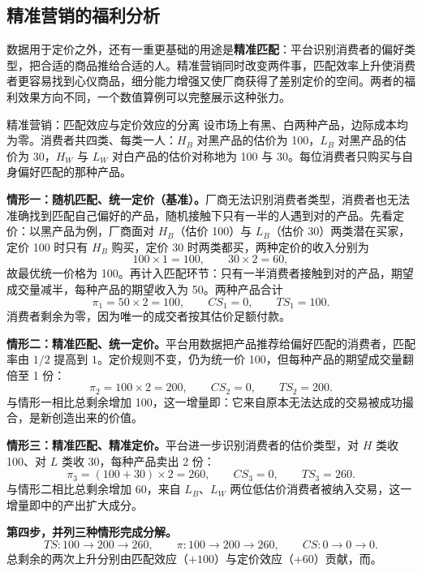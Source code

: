 \subsection{精准营销的福利分析}

数据用于定价之外，还有一重更基础的用途是\textbf{精准匹配}：平台识别消费者的偏好类型，把合适的商品推给合适的人。精准营销同时改变两件事，匹配效率上升使消费者更容易找到心仪商品，细分能力增强又使厂商获得了差别定价的空间。两者的福利效果方向不同，一个数值算例可以完整展示这种张力。

\begin{derivation}{精准营销：匹配效应与定价效应的分离}{}
设市场上有黑、白两种产品，边际成本均为零。消费者共四类、每类一人：$H_B$ 对黑产品的估价为 100，$L_B$ 对黑产品的估价为 30，$H_W$ 与 $L_W$ 对白产品的估价对称地为 100 与 30。每位消费者只购买与自身偏好匹配的那种产品。

\textbf{情形一：随机匹配、统一定价（基准）。}厂商无法识别消费者类型，消费者也无法准确找到匹配自己偏好的产品，随机接触下只有一半的人遇到对的产品。先看定价：以黑产品为例，厂商面对 $H_B$（估价 100）与 $L_B$（估价 30）两类潜在买家，定价 100 时只有 $H_B$ 购买，定价 30 时两类都买，两种定价的收入分别为
\[
100 \times 1 = 100, \qquad 30 \times 2 = 60,
\]
故最优统一价格为 100。再计入匹配环节：只有一半消费者接触到对的产品，期望成交量减半，每种产品的期望收入为 50。两种产品合计
\[
\pi_1 = 50 \times 2 = 100, \qquad CS_1 = 0, \qquad TS_1 = 100.
\]
消费者剩余为零，因为唯一的成交者按其估价足额付款。

\textbf{情形二：精准匹配、统一定价。}平台用数据把产品推荐给偏好匹配的消费者，匹配率由 $1/2$ 提高到 $1$。定价规则不变，仍为统一价 100，但每种产品的期望成交量翻倍至 1 份：
\[
\pi_2 = 100 \times 2 = 200, \qquad CS_2 = 0, \qquad TS_2 = 200.
\]
与情形一相比总剩余增加 100，这一增量即：它来自原本无法达成的交易被成功撮合，是新创造出来的价值。

\textbf{情形三：精准匹配、精准定价。}平台进一步识别消费者的估价类型，对 $H$ 类收 100、对 $L$ 类收 30，每种产品卖出 2 份：
\[
\pi_3 = (100 + 30) \times 2 = 260, \qquad CS_3 = 0, \qquad TS_3 = 260.
\]
与情形二相比总剩余增加 60，来自 $L_B$、$L_W$ 两位低估价消费者被纳入交易，这一增量即中的产出扩大成分。

\textbf{第四步，并列三种情形完成分解。}
\[
TS: 100 \to 200 \to 260, \qquad \pi: 100 \to 200 \to 260, \qquad CS: 0 \to 0 \to 0.
\]
总剩余的两次上升分别由匹配效应（$+100$）与定价效应（$+60$）贡献，而。
\end{derivation}

